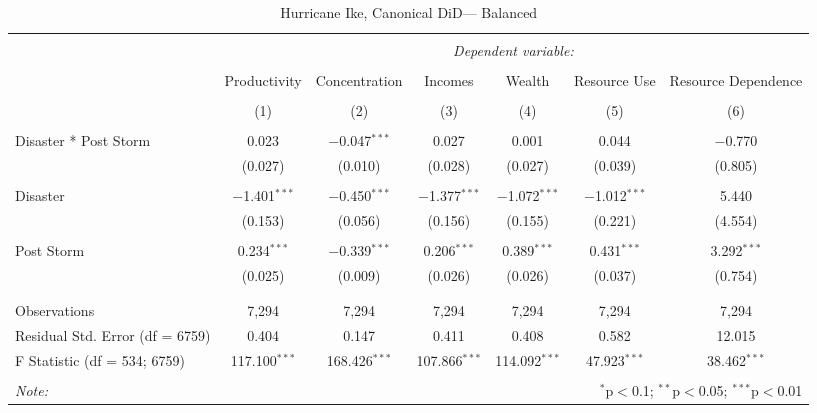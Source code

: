 
\begin{table}[!htbp] \centering 
  \caption{Hurricane Ike, Canonical DiD--- Balanced} 
  \label{} 
\footnotesize 
\begin{tabular}{@{\extracolsep{5pt}}lcccccc} 
\\[-1.8ex]\hline 
\hline \\[-1.8ex] 
 & \multicolumn{6}{c}{\textit{Dependent variable:}} \\ 
\cline{2-7} 
\\[-1.8ex] & Productivity & Concentration & Incomes & Wealth & Resource Use & Resource Dependence \\ 
\\[-1.8ex] & (1) & (2) & (3) & (4) & (5) & (6)\\ 
\hline \\[-1.8ex] 
 Disaster * Post Storm & 0.023 & $-$0.047$^{***}$ & 0.027 & 0.001 & 0.044 & $-$0.770 \\ 
  & (0.027) & (0.010) & (0.028) & (0.027) & (0.039) & (0.805) \\ 
  & & & & & & \\ 
 Disaster & $-$1.401$^{***}$ & $-$0.450$^{***}$ & $-$1.377$^{***}$ & $-$1.072$^{***}$ & $-$1.012$^{***}$ & 5.440 \\ 
  & (0.153) & (0.056) & (0.156) & (0.155) & (0.221) & (4.554) \\ 
  & & & & & & \\ 
 Post Storm & 0.234$^{***}$ & $-$0.339$^{***}$ & 0.206$^{***}$ & 0.389$^{***}$ & 0.431$^{***}$ & 3.292$^{***}$ \\ 
  & (0.025) & (0.009) & (0.026) & (0.026) & (0.037) & (0.754) \\ 
  & & & & & & \\ 
\hline \\[-1.8ex] 
Observations & 7,294 & 7,294 & 7,294 & 7,294 & 7,294 & 7,294 \\ 
Residual Std. Error (df = 6759) & 0.404 & 0.147 & 0.411 & 0.408 & 0.582 & 12.015 \\ 
F Statistic (df = 534; 6759) & 117.100$^{***}$ & 168.426$^{***}$ & 107.866$^{***}$ & 114.092$^{***}$ & 47.923$^{***}$ & 38.462$^{***}$ \\ 
\hline 
\hline \\[-1.8ex] 
\textit{Note:}  & \multicolumn{6}{r}{$^{*}$p$<$0.1; $^{**}$p$<$0.05; $^{***}$p$<$0.01} \\ 
\end{tabular} 
\end{table} 

